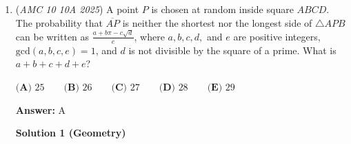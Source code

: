 \begin{enumerate}
 Now if $k$ is the largest digit in $n$ then $d_k$ can be either $1$ or $2$.

 An example: If $n=136852$, then $f(n)=\overline{121021010}_3$ or $\overline{121021020}_3$. 

 It's thus easy to see that there is a $1$-to-$2$ mapping from all fair integers to all $9$-digit base-$3$ nonzero numbers. Therefore the answer is $\frac{3^9-1}{2}$.

 



\textbf{Solution 5 (similar to [3])}

\textbf{Lemma:} Consider any $n$ digit fair integer, and drop the smallest digit. The $n-1$ version of a fair integer should be a fair integer.

 \textbf{Proof of the Lemma:}

 If $\overline{a_1 a_2 a_3 a_4 \dots a_k}$ with $k \leq 9$ is the integer, then firstly notice that if $a_1$ is the smallest, then $a_1$ must be on either one of the endpoints. If you drop this digit, $\overline{a_2 a_3 a_4 \dots a_k}$ is an integer. Since adding $a_1$ to either one of the endpoints is an identity (as $a_1$ is the smallest), the given integer must be fair as otherwise its $n$ digit interpretation is not fair. $\blacksquare$.

 \textbf{2025 AMC 12A P23:}

 From an $n-1$ string, we can choose a smaller digit and place it in two ways, the start or end point, and we have the recurrence, if $f(n)$ denotes the number of fair integers given $n$ digits: $f(n) = 2f(n-1)$. 

 One can simply bash the recurrence from here to obtain $\boxed{9841}$.

 


	\item (\textit{AMC 10 10A 2025}) A point $P$ is chosen at random inside square $ABCD$. The probability that $\overline{AP}$ is neither the shortest nor the longest side of $\triangle APB$ can be written as $\frac{a + b \pi - c \sqrt{d}}{e}$, where $a, b, c, d,$ and $e$ are positive integers, $\text{gcd}(a, b, c, e) = 1$, and $d$ is not divisible by the square of a prime. What is $a+b+c+d+e$?


 $\textbf{(A) }25 \qquad \textbf{(B) }26 \qquad \textbf{(C) }27 \qquad \textbf{(D) }28 \qquad \textbf{(E) }  29 \qquad$

 \textbf{Answer: }A



\textbf{Solution 1 (Geometry)}



\end{enumerate}
